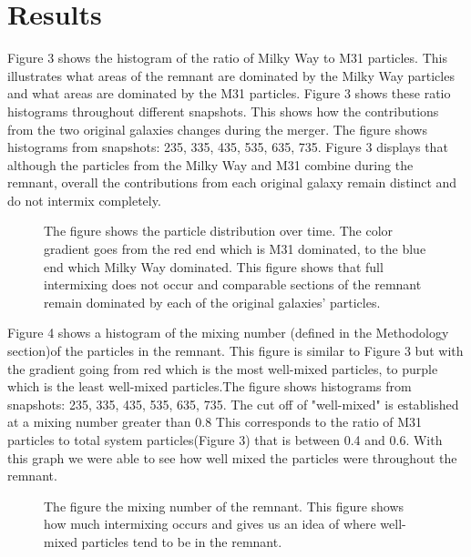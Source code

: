 \documentclass[linenumbers,trackchanges,twocolumn]{aastex7}
\begin{document}
\section{Results} \label{sec:style}
Figure 3 shows the histogram of the ratio of Milky Way to M31 particles. This illustrates what areas of the remnant are dominated by the Milky Way particles and what areas are dominated by the M31 particles. Figure 3 shows these ratio histograms throughout different snapshots. This shows how the contributions from the two original galaxies changes during the merger. The figure shows histograms from snapshots: 235, 335, 435, 535, 635, 735. Figure 3 displays that although the particles from the Milky Way and M31 combine during the remnant, overall the contributions from each original galaxy remain distinct and do not intermix completely. 
\begin{figure}[ht!]
\caption{The figure shows the particle distribution over time. The color gradient goes from the red end which is M31 dominated, to the blue end which Milky Way dominated. This figure shows that full intermixing does not occur and comparable sections of the remnant remain dominated by each of the original galaxies' particles.
\label{fig:general}}
\end{figure}

Figure 4 shows a histogram of the mixing number (defined in the Methodology section)of the particles in the remnant. This figure is similar to Figure 3 but with the gradient going from red which is the most well-mixed particles, to purple which is the least well-mixed particles.The figure shows histograms from snapshots: 235, 335, 435, 535, 635, 735. The cut off of "well-mixed" is established at a mixing number greater than 0.8 This corresponds to the ratio of M31 particles to total system particles(Figure 3) that is between 0.4 and 0.6. With this graph we were able to see how well mixed the particles were throughout the remnant. 
\begin{figure}[ht!]
\caption{The figure the mixing number of the remnant. This figure shows how much intermixing occurs and gives us an idea of where well-mixed particles tend to be in the remnant.
\label{fig:general}}
\end{figure}
\end{document}
